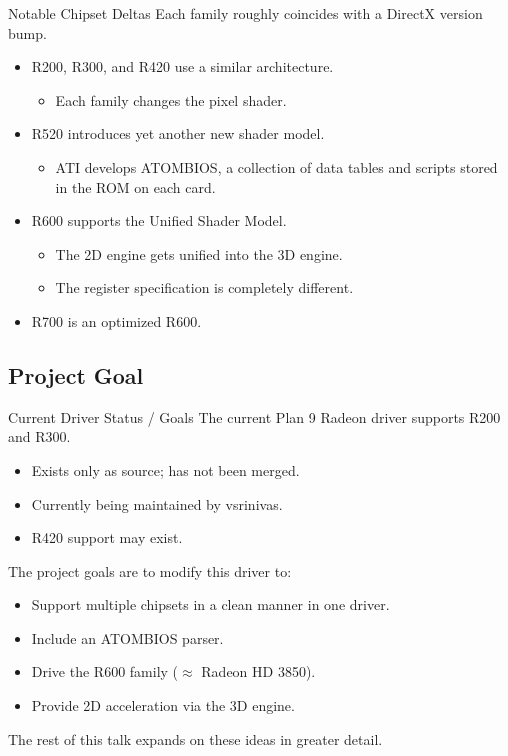 \documentclass[xcolor=dvipsnames]{beamer}
\begin{document}
\begin{frame}[t]{Notable Chipset Deltas}
	Each family roughly coincides with a DirectX version bump.

	\begin{itemize}
		\item R200, R300, and R420 use a similar architecture.
		\begin{itemize}
			\item Each family changes the pixel shader.
		\end{itemize}

		\pause
		\item R520 introduces yet another new shader model.
		\begin{itemize}
			\item ATI develops ATOMBIOS, a collection of data tables and scripts stored in the ROM on each card.
		\end{itemize}

		\pause
		\item R600 supports the Unified Shader Model.
		\begin{itemize}
			\item The 2D engine gets unified into the 3D engine.
			\item The register specification is completely different.
		\end{itemize}

		\pause
		\item R700 is an optimized R600.
	\end{itemize}
\end{frame}


\subsection{Project Goal}

\begin{frame}[t]{Current Driver Status / Goals}
	The current Plan 9 Radeon driver supports R200 and R300.
	\begin{itemize}
		\item Exists only as source; has not been merged.
		\item Currently being maintained by vsrinivas.
		\item R420 support may exist.
	\end{itemize}
	
	\pause
	The project goals are to modify this driver to:
	\begin{itemize}
		\item Support multiple chipsets in a clean manner in one driver.
		\item Include an ATOMBIOS parser.
		\item Drive the R600 family ($\approx$ Radeon HD 3850).
		\item Provide 2D acceleration via the 3D engine.
	\end{itemize}
	
	\pause
	The rest of this talk expands on these ideas in greater detail.
\end{frame}
\end{document}
